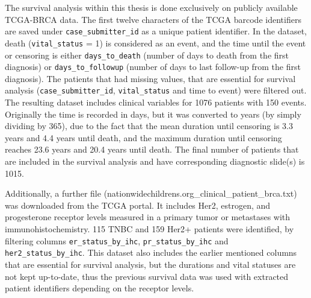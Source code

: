 The survival analysis within this thesis is done exclusively on publicly available TCGA-BRCA data.
The first twelve characters of the TCGA barcode identifiers are saved under \texttt{case\_submitter\_id}
as a unique patient identifier. 
In the dataset, death (\texttt{vital\_status} = 1) is considered as an event, and the time until the
event or censoring is either \texttt{days\_to\_death} (number of days to death from the first diagnosis)
or \texttt{days\_to\_followup} (number of days to last follow-up from the first diagnosis). The patients
that had missing values, that are essential for survival analysis (\texttt{case\_submitter\_id},
\texttt{vital\_status} and time to event) were filtered out. The resulting dataset includes clinical
variables for 1076 patients with 150 events.
Originally the time is recorded in days, but it was converted to years (by simply dividing by 365),
due to the fact that the mean duration until censoring is 3.3 years and 4.4 years until death,
and the maximum duration until censoring reaches 23.6 years and 20.4 years until death. 
The final number of patients that are included in the survival analysis and have corresponding diagnostic slide(s) is 1015.

Additionally, a further file (nationwidechildrens.org\_clinical\_patient\_brca.txt)
was downloaded from the TCGA portal. It includes Her2, estrogen, and progesterone
receptor levels measured in a primary tumor or metastases with immunohistochemistry.
115 TNBC and 159 Her2+ patients were identified, by filtering columns
\texttt{er\_status\_by\_ihc}, \texttt{pr\_status\_by\_ihc} and \texttt{her2\_status\_by\_ihc}.
This dataset also includes the earlier mentioned columns that are essential for survival analysis, but the durations and
vital statuses are not kept up-to-date, thus the previous survival data was used with extracted patient identifiers
depending on the receptor levels.
